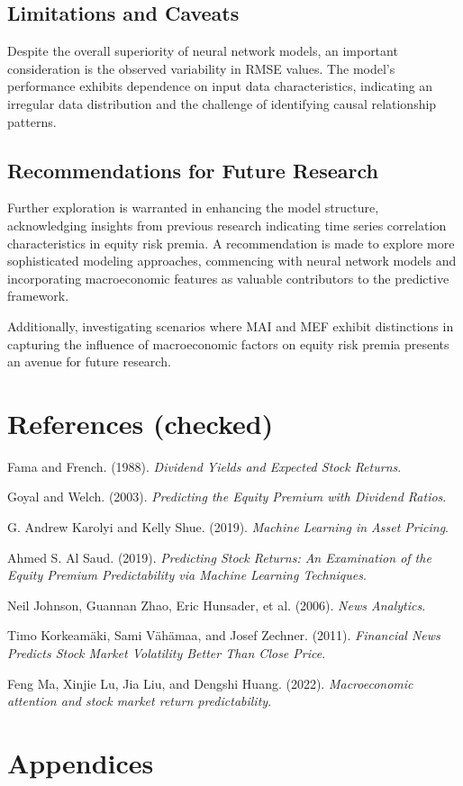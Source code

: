 \documentclass{article}
\begin{document}
\subsection{Limitations and Caveats}

Despite the overall superiority of neural network models, an important consideration is the observed variability in RMSE values. The model's performance exhibits dependence on input data characteristics, indicating an irregular data distribution and the challenge of identifying causal relationship patterns.

\subsection{Recommendations for Future Research}

Further exploration is warranted in enhancing the model structure, acknowledging insights from previous research indicating time series correlation characteristics in equity risk premia. A recommendation is made to explore more sophisticated modeling approaches, commencing with neural network models and incorporating macroeconomic features as valuable contributors to the predictive framework.

\noindent Additionally, investigating scenarios where MAI and MEF exhibit distinctions in capturing the influence of macroeconomic factors on equity risk premia presents an avenue for future research. 

\newpage

\section{References (checked)}


\begin{thebibliography}{9}
Fama and French. (1988). \emph{Dividend Yields and Expected Stock Returns}. 

Goyal and Welch. (2003). \emph{Predicting the Equity Premium with Dividend Ratios}.

G. Andrew Karolyi and Kelly Shue. (2019). \emph{Machine Learning in Asset Pricing}.

Ahmed S. Al Saud. (2019). \emph{Predicting Stock Returns: An Examination of the Equity Premium Predictability via Machine Learning Techniques}.

Neil Johnson, Guannan Zhao, Eric Hunsader, et al. (2006). \emph{News Analytics}.

Timo Korkeamäki, Sami Vähämaa, and Josef Zechner. (2011). \emph{Financial News Predicts Stock Market Volatility Better Than Close Price}.

Feng Ma, Xinjie Lu, Jia Liu, and Dengshi Huang. (2022). \emph{Macroeconomic attention and stock market return predictability}.

\end{thebibliography}

\newpage

\section{Appendices}
\end{document}

